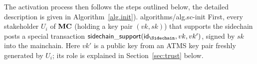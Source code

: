 

The activation process then follows the steps outlined below, the detailed
description is  given in
Algorithm~\ref{alg.init}).
{algorithms/alg.sc-init}
    First, every stakeholder $U_i$ of $\mathbf{MC}$ (holding a key pair $(vk,sk)$) that supports the sidechain
    posts a special transaction
    $
    \mathsf{sidechain\_support}(\id_\Sidechain,vk,vk')
    $,
    signed by $sk$
    into the mainchain. Here $vk'$ is a public key from an ATMS key pair
    freshly generated by $U_i$; its role is explained in Section~\ref{sec:trust}
    below.

